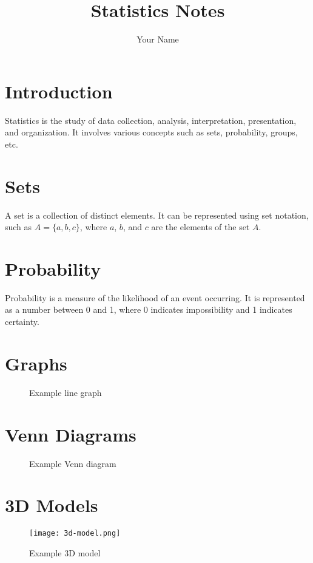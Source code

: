 \documentclass{article}
\title{Statistics Notes}
\author{Your Name}
\begin{document}
\maketitle

\section{Introduction}
Statistics is the study of data collection, analysis, interpretation, presentation, and organization. It involves various concepts such as sets, probability, groups, etc.

\section{Sets}
A set is a collection of distinct elements. It can be represented using set notation, such as $A = \{a, b, c\}$, where $a$, $b$, and $c$ are the elements of the set $A$.

\section{Probability}
Probability is a measure of the likelihood of an event occurring. It is represented as a number between 0 and 1, where 0 indicates impossibility and 1 indicates certainty.

\section{Graphs}
\begin{figure}[ht]
    \centering
    \caption{Example line graph}
    \label{fig:line-graph}
\end{figure}

\section{Venn Diagrams}
\begin{figure}[ht]
    \centering
    \caption{Example Venn diagram}
    \label{fig:venn-diagram}
\end{figure}

\section{3D Models}
\begin{figure}[ht]
    \centering
    \texttt{[image: 3d-model.png]}
    \caption{Example 3D model}
    \label{fig:3d-model}
\end{figure}
\end{document}
